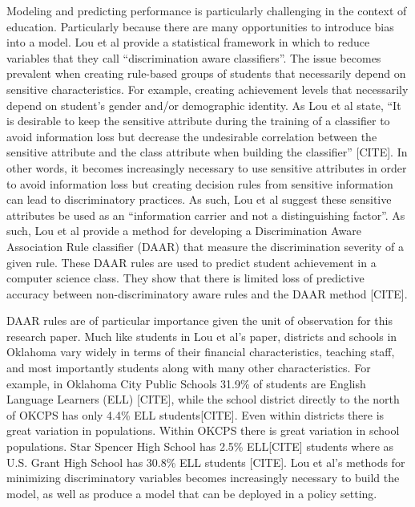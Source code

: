 \documentclass[]{article}
\begin{document}
Modeling and predicting performance is particularly challenging in the context of education. Particularly because there are many opportunities to introduce bias into a model. Lou et al provide a statistical framework in which to reduce variables that they call “discrimination aware classifiers”. The issue becomes prevalent when creating rule-based groups of students that necessarily depend on sensitive characteristics. For example, creating achievement levels that necessarily depend on student’s gender and/or demographic identity. As Lou et al state, “It is desirable to keep the sensitive attribute during the training of a classifier to avoid information loss but decrease the undesirable correlation between the sensitive attribute and the class attribute when building the classifier” [CITE]. In other words, it becomes increasingly necessary to use sensitive attributes in order to avoid information loss but creating decision rules from sensitive information can lead to discriminatory practices. As such, Lou et al suggest these sensitive attributes be used as an “information carrier and not a distinguishing factor”.  As such, Lou et al provide a method for developing a Discrimination Aware Association Rule classifier (DAAR) that measure the discrimination severity of a given rule. These DAAR rules are used to predict student achievement in a computer science class. They show that there is limited loss of predictive accuracy between non-discriminatory aware rules and the DAAR method [CITE].

DAAR rules are of particular importance given the unit of observation for this research paper. Much like students in Lou et al’s paper, districts and schools in Oklahoma vary widely in terms of their financial characteristics, teaching staff, and most importantly students along with many other characteristics. For example, in Oklahoma City Public Schools 31.9\% of students are English Language Learners (ELL) [CITE], while the school district directly to the north of OKCPS has only 4.4\% ELL students[CITE]. Even within districts there is great variation in populations. Within OKCPS there is great variation in school populations. Star Spencer High School has 2.5\% ELL[CITE] students where as U.S. Grant High School has 30.8\% ELL students [CITE]. Lou et al’s methods for minimizing discriminatory variables becomes increasingly necessary to build the model, as well as produce a model that can be deployed in a policy setting. 
\end{document}
